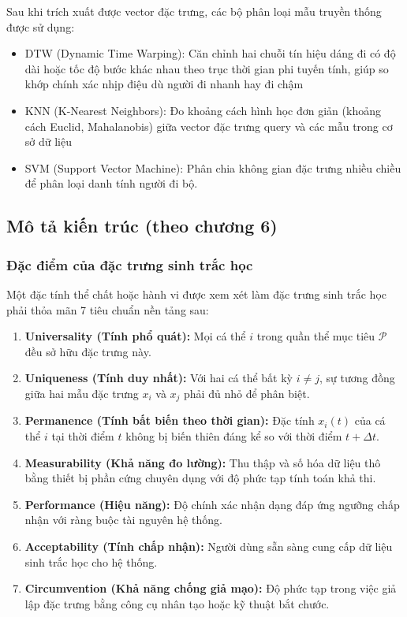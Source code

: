 Sau khi trích xuất được vector đặc trưng, các bộ phân loại mẫu truyền thống được sử dụng:

\begin{itemize}
    \item DTW (Dynamic Time Warping): Căn chỉnh hai chuỗi tín hiệu dáng đi có độ dài hoặc tốc độ bước khác nhau theo trục thời gian phi tuyến tính, giúp so khớp chính xác nhịp điệu dù người đi nhanh hay đi chậm
    \item KNN (K-Nearest Neighbors): Đo khoảng cách hình học đơn giản (khoảng cách Euclid, Mahalanobis) giữa vector đặc trưng query và các mẫu trong cơ sở dữ liệu
    \item SVM (Support Vector Machine): Phân chia không gian đặc trưng nhiều chiều để phân loại danh tính người đi bộ.
\end{itemize}

\subsection{Mô tả kiến trúc (theo chương 6)}
\subsubsection{Đặc điểm của đặc trưng sinh trắc học}
Một đặc tính thể chất hoặc hành vi được xem xét làm đặc trưng sinh trắc học phải thỏa mãn 7 tiêu chuẩn nền tảng sau:
\begin{enumerate}
    \item \textbf{Universality (Tính phổ quát):} Mọi cá thể $i$ trong quần thể mục tiêu $\mathcal{P}$ đều sở hữu đặc trưng này.
    \item \textbf{Uniqueness (Tính duy nhất):} Với hai cá thể bất kỳ $i \neq j$, sự tương đồng giữa hai mẫu đặc trưng $x_i$ và $x_j$ phải đủ nhỏ để phân biệt.
    \item \textbf{Permanence (Tính bất biến theo thời gian):} Đặc tính $x_i(t)$ của cá thể $i$ tại thời điểm $t$ không bị biến thiên đáng kể so với thời điểm $t + \Delta t$.
    \item \textbf{Measurability (Khả năng đo lường):} Thu thập và số hóa dữ liệu thô bằng thiết bị phần cứng chuyên dụng với độ phức tạp tính toán khả thi.
    \item \textbf{Performance (Hiệu năng):} Độ chính xác nhận dạng đáp ứng ngưỡng chấp nhận với ràng buộc tài nguyên hệ thống.
    \item \textbf{Acceptability (Tính chấp nhận):} Người dùng sẵn sàng cung cấp dữ liệu sinh trắc học cho hệ thống.
    \item \textbf{Circumvention (Khả năng chống giả mạo):} Độ phức tạp trong việc giả lập đặc trưng bằng công cụ nhân tạo hoặc kỹ thuật bắt chước.
\end{enumerate}

